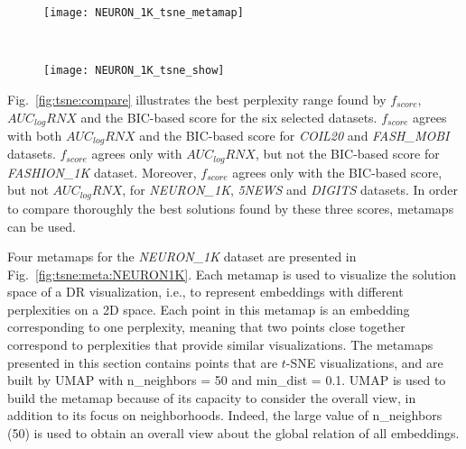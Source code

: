 \begin{figure*}[]%
    \centering
    \begin{subfigure}[b]{.8\linewidth}
        \texttt{[image: NEURON\_1K\_tsne\_metamap]}
    \end{subfigure}
    ~
    \begin{subfigure}[b]{.8\linewidth}
        \texttt{[image: NEURON\_1K\_tsne\_show]}
    \end{subfigure}
    \caption{Metamap and sample visualizations for the selected parameters for \emph{NEURON\_1K} dataset.}
    \label{fig:tsne:meta:NEURON1K}
\end{figure*}

Fig.~\ref{fig:tsne:compare} illustrates the best perplexity range found by $f_{score}$, $AUC_{log}RNX$ and the BIC-based score for the six selected datasets.
$f_{score}$ agrees with both $AUC_{log}RNX$ and the BIC-based score for \emph{COIL20} and \emph{FASH\_MOBI} datasets.
$f_{score}$ agrees only with $AUC_{log}RNX$, but not the BIC-based score for \emph{FASHION\_1K} dataset.
Moreover, $f_{score}$ agrees only with the BIC-based score, but not $AUC_{log}RNX$, for \emph{NEURON\_1K}, \emph{5NEWS} and \emph{DIGITS} datasets.
In order to compare thoroughly the best solutions found by these three scores, metamaps can be used.

Four metamaps for the \emph{NEURON\_1K} dataset are presented in Fig.~\ref{fig:tsne:meta:NEURON1K}. Each metamap is used to visualize the solution space of a DR visualization, i.e., to represent embeddings with different perplexities on a 2D space.
Each point in this metamap is an embedding corresponding to one perplexity, meaning that two points close together correspond to perplexities that provide similar visualizations.
The metamaps presented in this section contains points that are $t$-SNE visualizations, and are built by UMAP with {n\_neighbors} = 50 and {min\_dist} = 0.1.
UMAP is used to build the metamap because of its capacity to consider the overall view, in addition to its focus on neighborhoods. Indeed, the large value of {n\_neighbors} (50) is used to obtain an overall view about the global relation of all embeddings.

